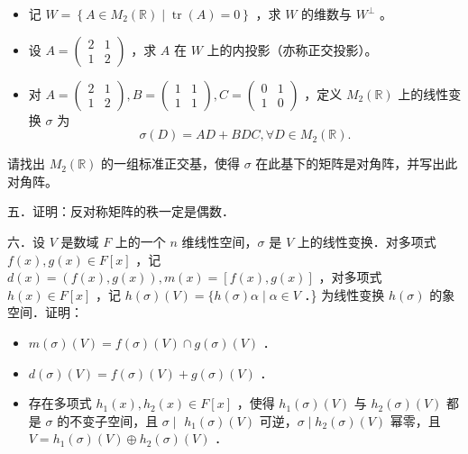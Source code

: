 \documentclass{article}
\begin{document}
\begin{itemize}

  \item[1．] 记 \(W=\left\{A \in M_{2}(\mathbb{R}) \mid \operatorname{tr}(A)=0\right\}\) ，求 \(W\) 的维数与 \(W^{\perp}\) 。

  \item[2．] 设 \(A=\left(\begin{array}{ll}2 & 1 \\ 1 & 2\end{array}\right)\) ，求 \(A\) 在 \(W\) 上的内投影（亦称正交投影）。

  \item[3．] 对 \(A=\left(\begin{array}{ll}2 & 1 \\ 1 & 2\end{array}\right), B=\left(\begin{array}{ll}1 & 1 \\ 1 & 1\end{array}\right), C=\left(\begin{array}{ll}0 & 1 \\ 1 & 0\end{array}\right)\) ，定义 \(M_{2}(\mathbb{R})\) 上的线性变换 \(\sigma\) 为
\[
\sigma(D)=A D+B D C, \forall D \in M_{2}(\mathbb{R}) .
\]
\end{itemize}

请找出 \(M_{2}(\mathbb{R})\) 的一组标准正交基，使得 \(\sigma\) 在此基下的矩阵是对角阵，并写出此对角阵。

五．证明：反对称矩阵的秩一定是偶数．

六．设 \(V\) 是数域 \(F\) 上的一个 \(n\) 维线性空间，\(\sigma\) 是 \(V\) 上的线性变换．对多项式 \(f(x), g(x) \in F[x]\) ，记 \(d(x)=(f(x), g(x)), m(x)=[f(x), g(x)]\) ，对多项式 \(h(x) \in F[x]\) ，记 \(h(\sigma)(V)=\{h(\sigma) \alpha \mid \alpha \in V\) ．\} 为线性变换 \(h(\sigma)\) 的象空间．证明：

\begin{itemize}

  \item[1．] \(m(\sigma)(V)=f(\sigma)(V) \cap g(\sigma)(V)\) ．

  \item[2．] \(d(\sigma)(V)=f(\sigma)(V)+g(\sigma)(V)\) ．

  \item[3．] 存在多项式 \(h_{1}(x), h_{2}(x) \in F[x]\) ，使得 \(h_{1}(\sigma)(V)\) 与 \(h_{2}(\sigma)(V)\) 都是 \(\sigma\) 的不变子空间，且 \(\sigma \mid\) \(h_{1}(\sigma)(V)\) 可逆，\(\sigma \mid h_{2}(\sigma)(V)\) 幂零，且 \(V=h_{1}(\sigma)(V) \oplus h_{2}(\sigma)(V)\) ．
\end{itemize}
\end{document}
